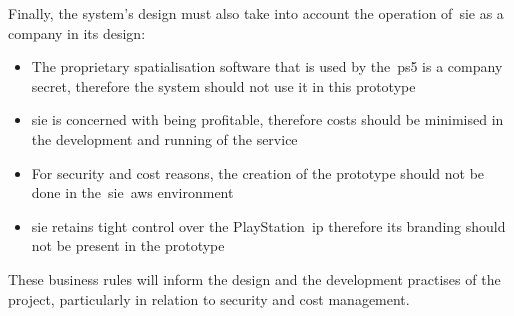 Finally, the system's design must also take into account the operation of~\gls{sie} as a company in its design:

\begin{itemize}
    \item The proprietary spatialisation software that is used by the~\gls{ps5} is a company secret, therefore the system should not use it in this prototype
    \item \gls{sie} is concerned with being profitable, therefore costs should be minimised in the development and running of the service
    \item For security and cost reasons, the creation of the prototype should not be done in the~\gls{sie}~\gls{aws} environment
    \item \gls{sie} retains tight control over the PlayStation~\gls{ip} therefore its branding should not be present in the prototype
\end{itemize}

These business rules will inform the design and the development practises of the project, particularly in relation to security and cost management.